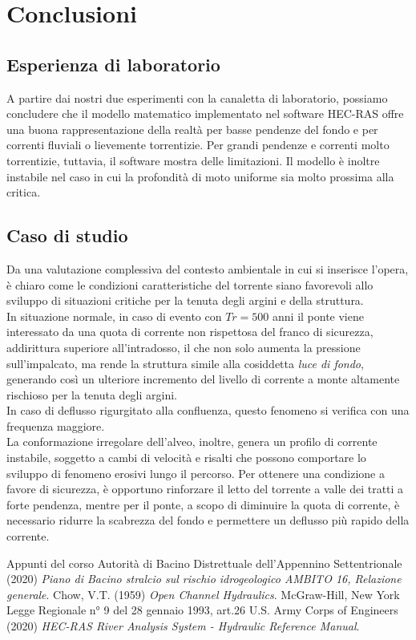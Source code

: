 \documentclass[12pt]{article} %
\begin{document}
\newpage
\section{Conclusioni}

\subsection{Esperienza di laboratorio}

\noindent A partire dai nostri due esperimenti con la canaletta di laboratorio, possiamo concludere che il modello matematico implementato nel software HEC-RAS offre una buona rappresentazione della realtà per basse pendenze del fondo e per correnti fluviali o lievemente torrentizie. Per grandi pendenze e correnti molto torrentizie, tuttavia, il software mostra delle limitazioni. Il modello è inoltre instabile nel caso in cui la profondità di moto uniforme sia molto prossima alla critica.

\subsection{Caso di studio}

\noindent Da una valutazione complessiva del contesto ambientale in cui si inserisce l'opera, è chiaro come le condizioni caratteristiche del torrente siano favorevoli allo sviluppo di situazioni critiche per la tenuta degli argini e della struttura.\\
In situazione normale, in caso di evento con $Tr=500$ anni il ponte viene interessato da una quota di corrente non rispettosa del franco di sicurezza, addirittura superiore all'intradosso, il che non solo aumenta la pressione sull'impalcato, ma rende la struttura simile alla cosiddetta \textit{luce di fondo}, generando così un ulteriore incremento del livello di corrente a monte altamente rischioso per la tenuta degli argini.\\
In caso di deflusso rigurgitato alla confluenza, questo fenomeno si verifica con una frequenza maggiore.\\
La conformazione irregolare dell'alveo, inoltre, genera un profilo di corrente instabile, soggetto a cambi di velocità e risalti che possono comportare lo sviluppo di fenomeno erosivi lungo il percorso.
Per ottenere una condizione a favore di sicurezza, è opportuno rinforzare il letto del torrente a valle dei tratti a forte pendenza, mentre per il ponte, a scopo di diminuire la quota di corrente, è necessario ridurre la scabrezza del fondo e permettere un deflusso più rapido della corrente.

\newpage
\begin{thebibliography}{}
Appunti del corso
 Autorità di Bacino Distrettuale dell'Appennino Settentrionale (2020) \textit{Piano di Bacino stralcio sul rischio idrogeologico AMBITO 16, Relazione generale}.
Chow, V.T. (1959) \textit{Open Channel Hydraulics}. McGraw-Hill, New York
 Legge Regionale n° 9 del 28 gennaio 1993, art.26
U.S. Army Corps of Engineers (2020) \textit{HEC-RAS River Analysis System - Hydraulic Reference Manual}. 
 
\end{thebibliography}
\end{document}
